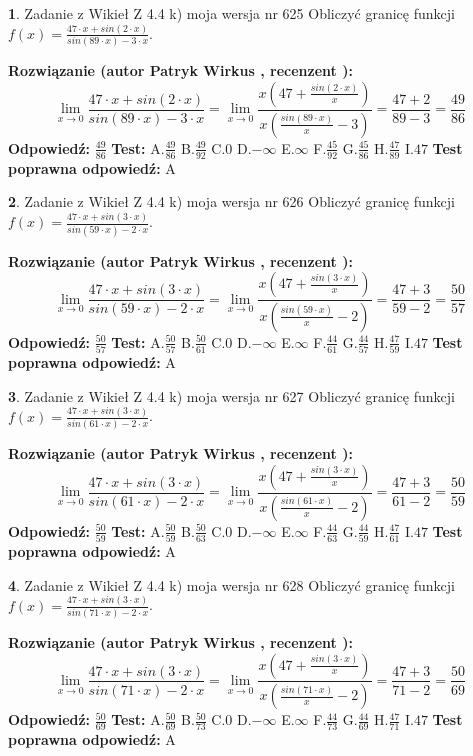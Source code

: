\documentclass[12pt, a4paper]{article}
\theoremstyle{definition} %
\newtheorem{zad}{}
\newcommand{\zadStart}[1]{\begin{zad}#1\newline}
\newcommand{\zadStop}{\end{zad}}
\newcommand{\rozwStart}[2]{\noindent \textbf{Rozwiązanie (autor #1 , recenzent #2): }\newline}
\newcommand{\rozwStop}{\newline}
\newcommand{\odpStart}{\noindent \textbf{Odpowiedź:}\newline}
\newcommand{\odpStop}{\newline}
\newcommand{\testStart}{\noindent \textbf{Test:}\newline}
\newcommand{\testStop}{\newline}
\newcommand{\kluczStart}{\noindent \textbf{Test poprawna odpowiedź:}\newline}
\newcommand{\kluczStop}{\newline}
\begin{document}
\zadStart{Zadanie z Wikieł Z 4.4 k) moja wersja nr 625}
Obliczyć granicę funkcji $f(x)=\frac{47\cdot x +sin(2\cdot x)}{sin(89\cdot x) -3\cdot x}$.
\zadStop
\rozwStart{Patryk Wirkus}{}
$$\lim\limits_{x\to 0}\frac{47\cdot x +sin(2\cdot x)}{sin(89\cdot x) -3\cdot x}
=\lim\limits_{x\to 0}\frac{x(47+\frac{sin(2\cdot x)}{x})}{x(\frac{sin(89\cdot x)}{x}-3)}
=\frac{47+2}{89-3} = \frac{49}{86}$$
\rozwStop
\odpStart
$\frac{49}{86}$
\odpStop
\testStart
A.$\frac{49}{86}$
B.$\frac{49}{92}$
C.$0$
D.$-\infty$
E.$\infty$
F.$\frac{45}{92}$
G.$\frac{45}{86}$
H.$\frac{47}{89}$
I.$47$
\testStop
\kluczStart
A
\kluczStop



\zadStart{Zadanie z Wikieł Z 4.4 k) moja wersja nr 626}
Obliczyć granicę funkcji $f(x)=\frac{47\cdot x +sin(3\cdot x)}{sin(59\cdot x) -2\cdot x}$.
\zadStop
\rozwStart{Patryk Wirkus}{}
$$\lim\limits_{x\to 0}\frac{47\cdot x +sin(3\cdot x)}{sin(59\cdot x) -2\cdot x}
=\lim\limits_{x\to 0}\frac{x(47+\frac{sin(3\cdot x)}{x})}{x(\frac{sin(59\cdot x)}{x}-2)}
=\frac{47+3}{59-2} = \frac{50}{57}$$
\rozwStop
\odpStart
$\frac{50}{57}$
\odpStop
\testStart
A.$\frac{50}{57}$
B.$\frac{50}{61}$
C.$0$
D.$-\infty$
E.$\infty$
F.$\frac{44}{61}$
G.$\frac{44}{57}$
H.$\frac{47}{59}$
I.$47$
\testStop
\kluczStart
A
\kluczStop



\zadStart{Zadanie z Wikieł Z 4.4 k) moja wersja nr 627}
Obliczyć granicę funkcji $f(x)=\frac{47\cdot x +sin(3\cdot x)}{sin(61\cdot x) -2\cdot x}$.
\zadStop
\rozwStart{Patryk Wirkus}{}
$$\lim\limits_{x\to 0}\frac{47\cdot x +sin(3\cdot x)}{sin(61\cdot x) -2\cdot x}
=\lim\limits_{x\to 0}\frac{x(47+\frac{sin(3\cdot x)}{x})}{x(\frac{sin(61\cdot x)}{x}-2)}
=\frac{47+3}{61-2} = \frac{50}{59}$$
\rozwStop
\odpStart
$\frac{50}{59}$
\odpStop
\testStart
A.$\frac{50}{59}$
B.$\frac{50}{63}$
C.$0$
D.$-\infty$
E.$\infty$
F.$\frac{44}{63}$
G.$\frac{44}{59}$
H.$\frac{47}{61}$
I.$47$
\testStop
\kluczStart
A
\kluczStop



\zadStart{Zadanie z Wikieł Z 4.4 k) moja wersja nr 628}
Obliczyć granicę funkcji $f(x)=\frac{47\cdot x +sin(3\cdot x)}{sin(71\cdot x) -2\cdot x}$.
\zadStop
\rozwStart{Patryk Wirkus}{}
$$\lim\limits_{x\to 0}\frac{47\cdot x +sin(3\cdot x)}{sin(71\cdot x) -2\cdot x}
=\lim\limits_{x\to 0}\frac{x(47+\frac{sin(3\cdot x)}{x})}{x(\frac{sin(71\cdot x)}{x}-2)}
=\frac{47+3}{71-2} = \frac{50}{69}$$
\rozwStop
\odpStart
$\frac{50}{69}$
\odpStop
\testStart
A.$\frac{50}{69}$
B.$\frac{50}{73}$
C.$0$
D.$-\infty$
E.$\infty$
F.$\frac{44}{73}$
G.$\frac{44}{69}$
H.$\frac{47}{71}$
I.$47$
\testStop
\kluczStart
A
\kluczStop
\end{document}
